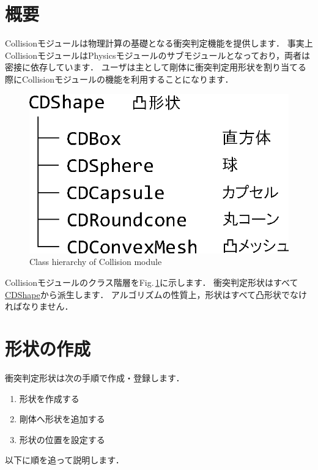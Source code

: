 \section{\KLUDGE 概要}

Collision\KLUDGE モジュールは物理計算の基礎となる衝突判定機能を提供します．
\KLUDGE 事実上Collision\KLUDGE モジュールはPhysics\KLUDGE モジュールのサブモジュールとなっており，両者は密接に依存しています．
\KLUDGE ユーザは主として剛体に衝突判定用形状を割り当てる際にCollision\KLUDGE モジュールの機能を利用することになります．

\begin{figure}[t]
\begin{center}
\includegraphics[width=.4\hsize]{fig/cdclass.eps}
\end{center}
\caption{Class hierarchy of Collision module}
\label{fig_cdclass}
\end{figure}

Collision\KLUDGE モジュールのクラス階層をFig.\,\ref{fig_cdclass}\KLUDGE に示します．
\KLUDGE 衝突判定形状はすべて\url{CDShape}\KLUDGE から派生します．
\KLUDGE アルゴリズムの性質上，形状はすべて凸形状でなければなりません．

\section{\KLUDGE 形状の作成}

\KLUDGE 衝突判定形状は次の手順で作成・登録します．
\begin{enumerate}
\item \KLUDGE 形状を作成する
\item \KLUDGE 剛体へ形状を追加する
\item \KLUDGE 形状の位置を設定する
\end{enumerate}
\KLUDGE 以下に順を追って説明します．


